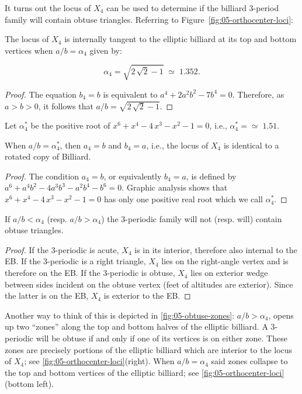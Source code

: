 It turns out the locus of $X_4$ can be used to determine if the billiard 3-period family will contain obtuse triangles. Referring to Figure~\ref{fig:05-orthocenter-loci}:

\begin{proposition}
The locus of $X_4$ is internally tangent to the elliptic billiard at its top and bottom vertices when $a/b=\alpha_4$ given by:

\[\alpha_4 = \sqrt{2\,\sqrt {2}-1}\;{\simeq}\;1.352.\]
\label{prop:05-alpha4}
\end{proposition}

\begin{proof}
The equation $b_4=b$ is equivalent to $a^4+2a^2b^2-7b^4=0.$ Therefore, as $a>b>0$, it follows that $a/b=\sqrt{2\,\sqrt {2}-1}.$
\end{proof}

\noindent Let $\alpha_4^*$ be the positive root of
${x}^{6}+{x}^{4}-4\,{x}^{3}-{x}^{2}-1=0$, i.e.,
$\alpha_4^{*}={\simeq}\;1.51$. 

\begin{proposition}
When $a/b=\alpha_4^{*}$, then $a_4=b$ and $b_4=a$, i.e., the locus of $X_4$ is identical to a rotated copy of Billiard. 
\end{proposition}

\begin{proof}
The condition $a_4=b$, or equivalently $b_4=a$, is defined by $a^6+a^4b^2-4a^3b^3-a^2b^4-b^6=0$. Graphic analysis shows that ${x}^{6}+{x}^{4}-4\,{x}^{3}-{x}^{2}-1=0$ has only one positive real root which we call $\alpha_4^*$.
\end{proof}

\begin{theorem}
If $a/b<\alpha_4$ (resp. $a/b>\alpha_4$) the 3-periodic family will not (resp. will) contain obtuse triangles.
\end{theorem}

\begin{proof}
If the 3-periodic is acute, $X_4$ is in its interior, therefore also internal to the EB. If the 3-periodic is a right triangle, $X_4$ lies on the right-angle vertex and is therefore on the EB. If the 3-periodic is obtuse, $X_4$ lies on exterior wedge between sides incident on the obtuse vertex (feet of altitudes are exterior). Since the latter is on the EB, $X_4$ is exterior to the EB.
\end{proof}

Another way to think of this is depicted in \cref{fig:05-obtuse-zones}: $a/b>\alpha_4$, opens up two ``zones'' along the top and bottom halves of the elliptic billiard. A 3-periodic will be obtuse if and only if one of its vertices is on either zone. These zones are precisely portions of the elliptic billiard which are interior to the locus of $X_4$; see \cref{fig:05-orthocenter-loci}(right). When $a/b=\alpha_4$ said zones collapse to the top and bottom vertices of the elliptic billiard; see \cref{fig:05-orthocenter-loci}(bottom left).

